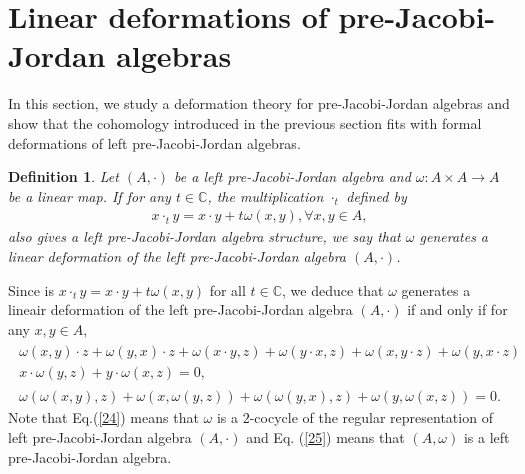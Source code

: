 \documentclass[12pt]{amsart}
\newtheorem{definition}[Theorem]{Definition}
\begin{document}
	\section{Linear deformations of pre-Jacobi-Jordan algebras }
	In this section, we study  a deformation theory for pre-Jacobi-Jordan algebras and show that the cohomology introduced in the previous section fits with formal deformations of left pre-Jacobi-Jordan algebras.
	\begin{definition}\label{D11}
		Let $(A,\cdot) $ be a left pre-Jacobi-Jordan algebra and $ \omega : A\times A\to A $ be a linear map. If for any $ t\in \mathbb{C} $, the multiplication $ \cdot_{t} $ defined by 
		\begin{eqnarray}
			\label{23}
			x\cdot_{t}y=x\cdot y+t\omega(x,y),\forall x,y\in A,
		\end{eqnarray}
		also gives a left pre-Jacobi-Jordan algebra structure, we say that $ \omega $ generates a linear deformation of the left pre-Jacobi-Jordan algebra $ (A,\cdot) $.	
	\end{definition}
	Since  is  $ x\cdot_{t}y=x\cdot y+t\omega(x,y)$ for all $ t\in \mathbb{C} $, we deduce that $ \omega $ generates a lineair deformation of the left pre-Jacobi-Jordan algebra $ (A,\cdot) $ if and only if for any $ x,y\in A $,
	\begin{eqnarray}
		\label{24}
		\begin{array}{lll}
			\omega(x,y)\cdot z+\omega(y,x)\cdot z
			+\omega(x\cdot y,z)+\omega(y\cdot x,z)+\omega(x,y\cdot z)+\omega(y,x\cdot z)\\
			x\cdot \omega(y,z)+y\cdot \omega(x,z)=0,
		\end{array}
	\end{eqnarray}
	\begin{eqnarray}
		\label{25}
		\omega(\omega(x,y),z)+\omega(x,\omega(y,z))+\omega(\omega(y,x),z)+\omega(y,\omega(x,z))=0.
	\end{eqnarray}
	Note that Eq.(\ref{24}) means that $ \omega $ is a $ 2 $-cocycle of the regular representation of left pre-Jacobi-Jordan algebra $ (A,\cdot) $ and Eq. (\ref{25}) means that $ (A,\omega) $ is a left pre-Jacobi-Jordan algebra. \\
	
\end{document}
